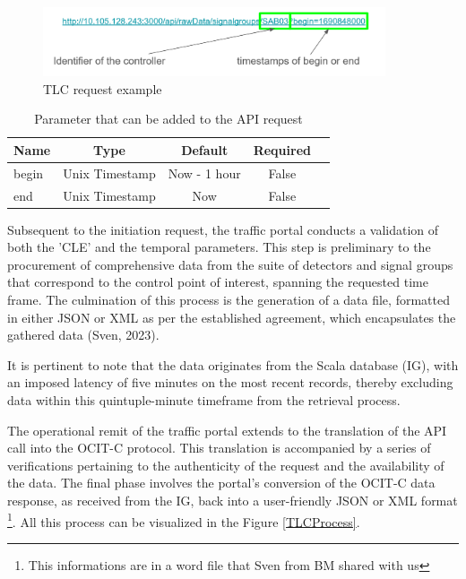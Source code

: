 \documentclass[12pt]{report}
\begin{document}
	\begin{center}
		\begin{figure}
			\centering
			\includegraphics[width=0.9\textwidth]{images/TLCRequest.png}
			\caption{TLC request example}
			\label{TLCRequest}
		\end{figure}
	\end{center}
	
	\begin{table}
		\centering
		\begin{tabular}{|p{0.1\textheight}|c|c|c|c|}
			\hline
			Name & Type & Default & Required  \\
			\hline
			begin & Unix Timestamp & Now - 1 hour & False\\
			\hline
			end & Unix Timestamp & Now & False \\
			\hline
			
		\end{tabular}
		\caption{Parameter that can be added to the API request}
		\label{table_param_TLC}
	\end{table}
	
	\vspace{-2cm}
	Subsequent to the initiation request, the traffic portal conducts a validation of both the 'CLE' and the temporal parameters. This step is preliminary to the procurement of comprehensive data from the suite of detectors and signal groups that correspond to the control point of interest, spanning the requested time frame. The culmination of this process is the generation of a data file, formatted in either JSON or XML as per the established agreement, which encapsulates the gathered data (Sven, 2023).
	
	It is pertinent to note that the data originates from the Scala database (IG), with an imposed latency of five minutes on the most recent records, thereby excluding data within this quintuple-minute timeframe from the retrieval process.
	
	The operational remit of the traffic portal extends to the translation of the API call into the OCIT-C protocol. This translation is accompanied by a series of verifications pertaining to the authenticity of the request and the availability of the data. The final phase involves the portal's conversion of the OCIT-C data response, as received from the IG, back into a user-friendly JSON or XML format \footnote{This informations are in a word file that Sven from BM shared with  us}. All this process can be visualized in the Figure \ref{TLCProcess}.
	
\end{document}
